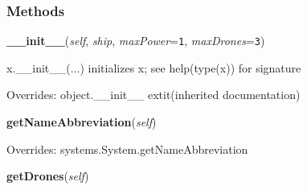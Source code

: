 
  \subsubsection{Methods}

    \vspace{0.5ex}

\hspace{.8\funcindent}\begin{boxedminipage}{\funcwidth}

    \raggedright \textbf{\_\_init\_\_}(\textit{self}, \textit{ship}, \textit{maxPower}={\tt 1}, \textit{maxDrones}={\tt 3})

\setlength{\parskip}{2ex}
    x.\_\_init\_\_(...) initializes x; see help(type(x)) for signature

\setlength{\parskip}{1ex}
      Overrides: object.\_\_init\_\_ 	extit{(inherited documentation)}

    \end{boxedminipage}

    \vspace{0.5ex}

\hspace{.8\funcindent}\begin{boxedminipage}{\funcwidth}

    \raggedright \textbf{getNameAbbreviation}(\textit{self})

\setlength{\parskip}{2ex}
\setlength{\parskip}{1ex}
      Overrides: systems.System.getNameAbbreviation

    \end{boxedminipage}

    \label{systems:DroneControl:getDrones}

    \vspace{0.5ex}

\hspace{.8\funcindent}\begin{boxedminipage}{\funcwidth}

    \raggedright \textbf{getDrones}(\textit{self})

\setlength{\parskip}{2ex}
\setlength{\parskip}{1ex}
    \end{boxedminipage}

